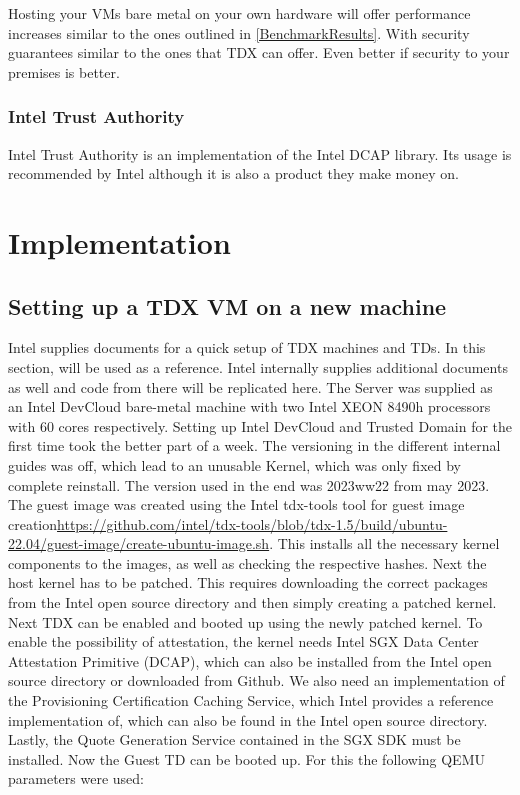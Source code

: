 Hosting your VMs bare metal on your own hardware will offer performance increases similar to the ones outlined in \ref{BenchmarkResults}. With security guarantees similar to the ones that TDX can offer. Even better if security to your premises is better.

\todo{}

\subsection{Intel Trust Authority}

Intel Trust Authority is an implementation of the Intel DCAP library. Its usage is recommended by Intel although it is also a product they make money on.

\chapter{Implementation}

\section{Setting up a TDX VM on a new machine}
\label{ch:SettingUpTDX}
Intel supplies documents for a quick setup of TDX machines and TDs. In this section, \cite{noauthor_white_nodate} will be used as a reference. Intel internally supplies additional documents as well and code from there will be replicated here. The Server was supplied as an Intel DevCloud bare-metal machine with two Intel XEON 8490h processors with 60 cores respectively. Setting up Intel DevCloud and Trusted Domain for the first time took the better part of a week. The versioning in the different internal guides was off, which lead to an unusable Kernel, which was only fixed by complete reinstall. The version used in the end was 2023ww22 from may 2023. The guest image was created using the Intel tdx-tools tool for guest image creation\url{https://github.com/intel/tdx-tools/blob/tdx-1.5/build/ubuntu-22.04/guest-image/create-ubuntu-image.sh}.
This installs all the necessary kernel components to the images, as well as checking the respective hashes. Next the host kernel has to be patched. This requires downloading the correct packages from the Intel open source directory and then simply creating a patched kernel. Next TDX can be enabled and booted up using the newly patched kernel. To enable the possibility of attestation, the kernel needs Intel SGX Data Center Attestation Primitive (DCAP), which can also be installed from the Intel open source directory or downloaded from Github. We also need an implementation of the Provisioning Certification Caching Service, which Intel provides a reference implementation of, which can also be found in the Intel open source directory. Lastly, the Quote Generation Service contained in the SGX SDK must be installed. Now the Guest TD can be booted up. For this the following QEMU parameters were used:

